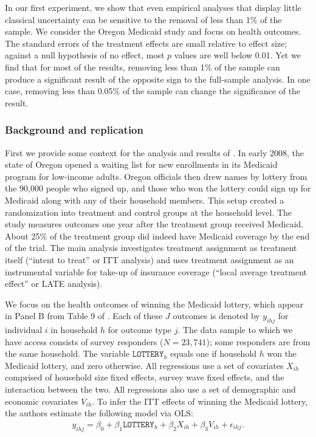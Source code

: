 In our first experiment, we show that even empirical analyses that display
little classical uncertainty can be sensitive to the removal of less than 1\% of
the sample. We consider the Oregon Medicaid study \citep{finkelstein2012oregon}
and focus on health outcomes. The standard errors of the treatment effects are
small relative to effect size; against a null hypothesis of no effect, most $p$
values are well below 0.01. Yet we find that for most of the results, removing
less than 1\% of the sample can produce a significant result of the opposite
sign to the full-sample analysis. In one case, removing less than 0.05\% of the
sample can change the significance of the result.

\subsubsection{Background and replication}
First we provide some context for the analysis and results of
\citet{finkelstein2012oregon}. In early 2008, the state of Oregon opened a
waiting list for new enrollments in its Medicaid program for low-income adults.
Oregon officials then drew names by lottery from the 90,000 people who signed
up, and those who won the lottery could sign up for Medicaid along with any of
their household members. This setup created a randomization into treatment and
control groups at the household level. The \citet{finkelstein2012oregon} study
measures outcomes one year after the treatment group received Medicaid. About
25\% of the treatment group did indeed have Medicaid coverage by the end of the
trial. The main analysis investigates treatment assignment as treatment itself
(``intent to treat'' or ITT analysis) and uses treatment assignment as an
instrumental variable for take-up of insurance coverage (``local average
treatment effect'' or LATE analysis).

We focus on the health outcomes of winning the Medicaid lottery, which appear in
Panel B from Table 9 of \citet{finkelstein2012oregon}. Each of these $J$
outcomes is denoted by $y_{ihj}$ for individual $i$ in household $h$ for outcome
type $j$. The data sample to which we have access consists of survey responders
($N = 23{,}741$); some responders are from the same household.  The variable
$\texttt{LOTTERY}_h$ equals one if household $h$ won the Medicaid lottery, and
zero otherwise. All regressions use a set of covariates $X_{ih}$ comprised of
household size fixed effects, survey wave fixed effects, and the interaction
between the two. All regressions also use a set of demographic and economic
covariates $V_{ih}$. To infer the ITT effects of winning the Medicaid lottery,
the authors estimate the following model via OLS: \begin{align*}
%
y_{ihj} = \beta_0 + \beta_1 \texttt{LOTTERY}_h + \beta_2 X_{ih} +
    \beta_3 V_{ih} + \epsilon_{ihj}.
%
\end{align*}

